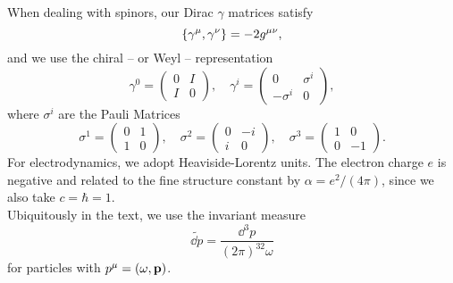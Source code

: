 When dealing with spinors, our Dirac $\gamma$ matrices satisfy
\begin{equation*}
    \pb{\gamma^\mu}{\gamma^\nu}=-2g^{\mu\nu},
\end{equation*}
and we use the chiral -- or Weyl -- representation
\begin{equation*}
\gamma^{0}=\left(\begin{array}{cc}
0 & I \\
I & 0
\end{array}\right), \quad \gamma^{i}=\left(\begin{array}{cc}
0 & \sigma^{i} \\
-\sigma^{i} & 0
\end{array}\right),
\end{equation*}
where $\sigma^i$ are the Pauli Matrices
\begin{equation*}
\sigma^{1}=\left(\begin{array}{ll}
0 & 1 \\
1 & 0
\end{array}\right), \quad \sigma^{2}=\left(\begin{array}{cc}
0 & -i \\
i & 0
\end{array}\right), \quad \sigma^{3}=\left(\begin{array}{cc}
1 & 0 \\
0 & -1
\end{array}\right).
\end{equation*}
For electrodynamics, we adopt Heaviside-Lorentz units. The electron charge $e$ is negative and related to the fine structure constant by $\alpha=e^2/(4\pi)$, since we also take $c=\hbar=1$.\\

Ubiquitously in the text, we use the invariant measure
\begin{equation*}
    \widetilde{\dd p}=\frac{\dd^3 p}{(2\pi)^32\omega}
\end{equation*}
for particles with $p^\mu=(\omega,\vb{p})$.